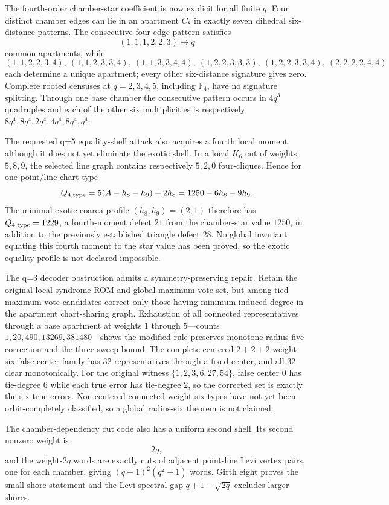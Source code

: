 The fourth-order chamber-star coefficient is now explicit for all finite $q$.  Four distinct chamber edges can lie in an apartment $C_8$ in exactly seven dihedral six-distance patterns.  The consecutive-four-edge pattern satisfies
\[
 (1,1,1,2,2,3)\longmapsto q
\]
common apartments, while
\[
 (1,1,2,2,3,4),\ (1,1,2,3,3,4),\ (1,1,3,3,4,4),\
 (1,2,2,3,3,3),\ (1,2,2,3,3,4),\ (2,2,2,2,4,4)
\]
each determine a unique apartment; every other six-distance signature gives zero.  Complete rooted censuses at $q=2,3,4,5$, including $\mathbb F_4$, have no signature splitting.  Through one base chamber the consecutive pattern occurs in $4q^3$ quadruples and each of the other six multiplicities is respectively $8q^4,8q^4,2q^4,4q^4,8q^4,q^4$.

The requested q=5 equality-shell attack also acquires a fourth local moment, although it does not yet eliminate the exotic shell.  In a local $K_6$ cut of weights $5,8,9$, the selected line graph contains respectively $5,2,0$ four-cliques.  Hence for one point/line chart type
\[
 Q_{4,\rm type}=5(A-h_8-h_9)+2h_8
 =1250-6h_8-9h_9.
\]
The minimal exotic coarea profile $(h_8,h_9)=(2,1)$ therefore has $Q_{4,\rm type}=1229$, a fourth-moment defect $21$ from the chamber-star value $1250$, in addition to the previously established triangle defect $28$.  No global invariant equating this fourth moment to the star value has been proved, so the exotic equality profile is not declared impossible.

The q=3 decoder obstruction admits a symmetry-preserving repair.  Retain the original local syndrome ROM and global maximum-vote set, but among tied maximum-vote candidates correct only those having minimum induced degree in the apartment chart-sharing graph.  Exhaustion of all connected representatives through a base apartment at weights $1$ through $5$---counts $1,20,490,13269,381480$---shows the modified rule preserves monotone radius-five correction and the three-sweep bound.  The complete centered $2+2+2$ weight-six false-center family has $32$ representatives through a fixed center, and all $32$ clear monotonically.  For the original witness $\{1,2,3,6,27,54\}$, false center $0$ has tie-degree $6$ while each true error has tie-degree $2$, so the corrected set is exactly the six true errors.  Non-centered connected weight-six types have not yet been orbit-completely classified, so a global radius-six theorem is not claimed.

The chamber-dependency cut code also has a uniform second shell.  Its second nonzero weight is
\[
 \boxed{2q},
\]
and the weight-$2q$ words are exactly cuts of adjacent point-line Levi vertex pairs, one for each chamber, giving $(q+1)^2(q^2+1)$ words.  Girth eight proves the small-shore statement and the Levi spectral gap $q+1-\sqrt{2q}$ excludes larger shores.

